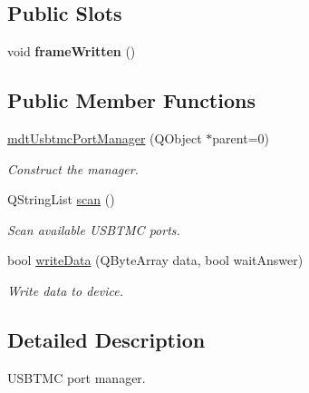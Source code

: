 \subsection*{Public Slots}
\begin{DoxyCompactItemize}
\item 
\hypertarget{classmdt_usbtmc_port_manager_af16af21bb713410e3441e0d092872aab}{
void {\bfseries frameWritten} ()}
\label{classmdt_usbtmc_port_manager_af16af21bb713410e3441e0d092872aab}

\end{DoxyCompactItemize}
\subsection*{Public Member Functions}
\begin{DoxyCompactItemize}
\item 
\hyperlink{classmdt_usbtmc_port_manager_a99a24e4360e70ffc63677dbe888513f7}{mdtUsbtmcPortManager} (QObject $\ast$parent=0)
\begin{DoxyCompactList}\small\item\em Construct the manager. \end{DoxyCompactList}\item 
QStringList \hyperlink{classmdt_usbtmc_port_manager_ab26aebdb694fab232f62e7c6084cc0fb}{scan} ()
\begin{DoxyCompactList}\small\item\em Scan available USBTMC ports. \end{DoxyCompactList}\item 
bool \hyperlink{classmdt_usbtmc_port_manager_afc1afc7deb3f5d7cf6031037d63e9bff}{writeData} (QByteArray data, bool waitAnswer)
\begin{DoxyCompactList}\small\item\em Write data to device. \end{DoxyCompactList}\end{DoxyCompactItemize}


\subsection{Detailed Description}
USBTMC port manager. 

